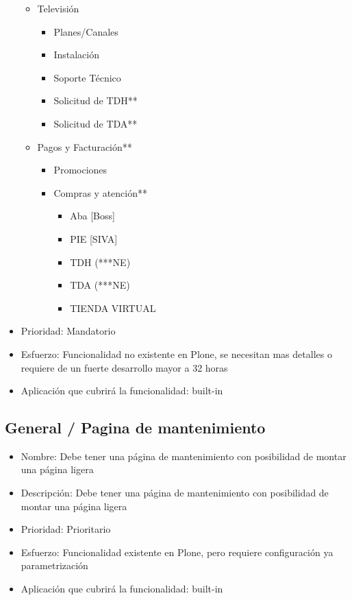 \documentclass[11pt, letterpaper, oneside, spanish]{scrbook}
\begin{document}
\begin{itemize}
\begin{itemize}
\begin{itemize}
\end{itemize}
\item Televisión
\begin{itemize}
\item Planes/Canales
\item Instalación
\item Soporte Técnico
\item Solicitud de TDH**
\item Solicitud de TDA**
\end{itemize}
\item Pagos y Facturación**
\begin{itemize}
\item Promociones
\item Compras y atención**
\begin{itemize}
\item Aba [Boss]
\item PIE [SIVA]
\item TDH (***NE)
\item TDA (***NE)
\item TIENDA VIRTUAL
\end{itemize}
\end{itemize}
\end{itemize}
\item Prioridad: Mandatorio
\item Esfuerzo: Funcionalidad no existente en Plone, se necesitan mas detalles o
  requiere de un fuerte desarrollo mayor a 32 horas
\item Aplicación que cubrirá la funcionalidad:  built-in
\end{itemize}
\subsection{General / Pagina de mantenimiento}
\label{sec-2-1-48}

\begin{itemize}
\item Nombre: Debe tener una página de mantenimiento con posibilidad de montar una página ligera
\item Descripción: Debe tener una página de mantenimiento con posibilidad de montar una página ligera
\item Prioridad: Prioritario
\item Esfuerzo: Funcionalidad existente en Plone, pero requiere configuración ya parametrización
\item Aplicación que cubrirá la funcionalidad:  built-in
\end{itemize}
\end{document}
